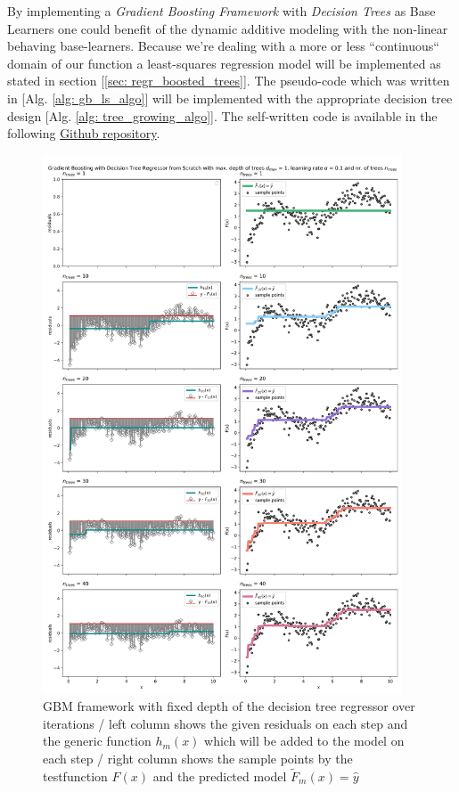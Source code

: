 \documentclass[12pt, a4paper]{article}
\begin{document}
By implementing a \textit{Gradient Boosting Framework} with \textit{Decision Trees} as Base Learners one could benefit of the dynamic additive modeling with the non-linear behaving base-learners.
Because we're dealing with a more or less ``continuous`` domain of our function a least-squares regression model will be implemented as stated in section [\ref{sec: regr_boosted_trees}]. The pseudo-code which was written in [Alg. \ref{alg: gb_ls_algo}] will be implemented with the appropriate decision tree design [Alg. \ref{alg: tree_growing_algo}]. The self-written code is available in the following \href{https://github.com/probabilis/bs_ml/tree/master/from_scratch}{Github repository}.
\begin{figure}[!htpb]
    \centering
    \includegraphics[width=0.95\textwidth,trim={0 0 0 0},clip]{figures/gbm_iterations.png}
    \caption[GBM framework iterations]{GBM framework with fixed depth of the decision tree regressor over iterations / left column shows the given residuals on each step and the generic function $h_m(x)$ which will be added to the model on each step / right column shows the sample points by the testfunction $F(x)$ and the predicted model $\tilde{F}_m(x) = \hat{y}$}
    \label{fig: gbm_iterations}    
\end{figure}
\end{document}

